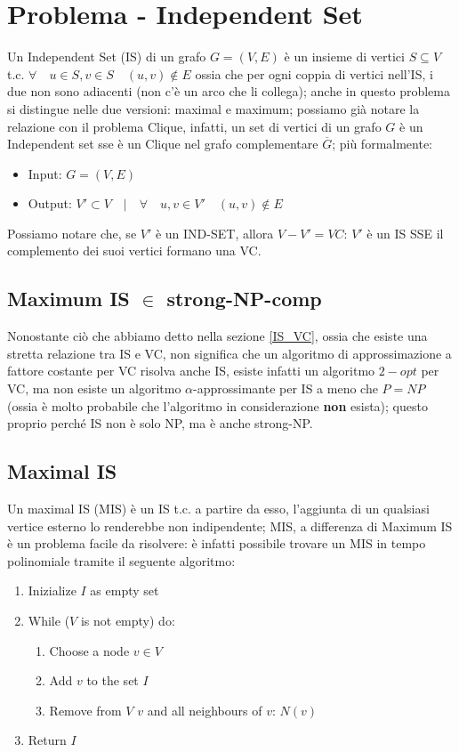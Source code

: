 \documentclass[12pt,a4paper]{article}
\begin{document}
\section{Problema - Independent Set}
Un Independent Set (IS) di un grafo $G = (V, E)$ è un insieme di vertici $S \subseteq V$ t.c. $\forall \quad u \in S, v \in S \quad (u, v) \notin E$ ossia che per ogni coppia di vertici nell'IS, i due non sono adiacenti (non c'è un arco che li collega); anche in questo problema si distingue nelle due versioni: maximal e maximum; possiamo già notare la relazione con il problema Clique, infatti, un set di vertici di un grafo $G$ è un Independent set sse è un Clique nel grafo complementare $\overline{G}$; più formalmente:
\begin{itemize}
\item Input: $G = (V, E)$
\item Output: $V' \subset V \quad \vert \quad \forall \quad u, v \in V' \quad (u, v) \notin E$
\end{itemize}
Possiamo notare che, se $V'$ è un IND-SET, allora $V - V' = VC$: $V'$ è un IS SSE il complemento dei suoi vertici formano una VC.

\subsection{Maximum IS $\in$ strong-NP-comp}
Nonostante ciò che abbiamo detto nella sezione \ref{IS_VC}, ossia che esiste una stretta relazione tra IS e VC, non significa che un algoritmo di approssimazione a fattore costante per VC risolva anche IS, esiste infatti un algoritmo $2-opt$ per VC, ma non esiste un algoritmo $\alpha$-approssimante per IS a meno che $P = NP$ (ossia è molto probabile che l'algoritmo in considerazione \textbf{non} esista); questo proprio perché IS non è solo NP, ma è anche strong-NP.

\subsection{Maximal IS}
Un maximal IS (MIS) è un IS t.c. a partire da esso, l'aggiunta di un qualsiasi vertice esterno lo renderebbe non indipendente; MIS, a differenza di Maximum IS è un problema facile da risolvere: è infatti possibile trovare un MIS  in tempo polinomiale tramite il seguente algoritmo:
\begin{enumerate}
\item Inizialize $I$ as empty set
\item While ($V$ is not empty) do:
\begin{enumerate}
\item Choose a node $v \in V$
\item Add $v$ to the set $I$
\item Remove from $V$ $v$ and all neighbours of $v$: $N(v)$
\end{enumerate}
\item Return $I$
\end{enumerate}
\end{document}
